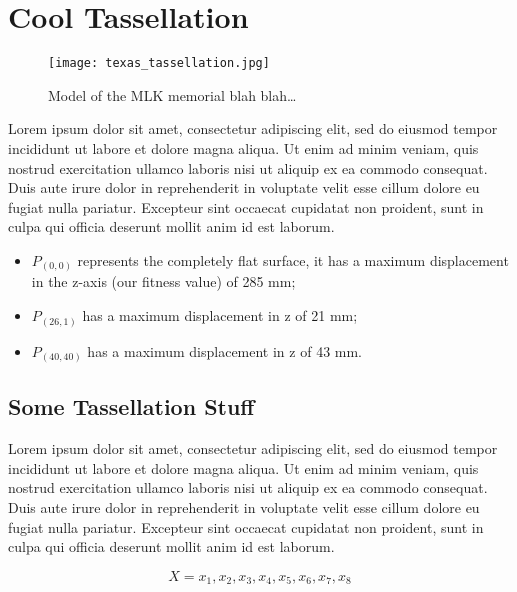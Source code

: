 \chapter{Cool Tassellation}
\label{chap:tass}


\begin{figure}[ht]%
\begin{center}
\begin{center}\texttt{[image: texas\_tassellation.jpg]}\end{center}
\caption{Model of the MLK memorial blah blah\ldots}
\label{fig:texas_tassellation}
\end{center}
\end{figure}

Lorem ipsum dolor sit amet, consectetur adipiscing elit, sed do eiusmod tempor
incididunt ut labore et dolore magna aliqua. Ut enim ad minim veniam, quis nostrud exercitation ullamco laboris nisi ut aliquip ex ea commodo consequat. Duis aute irure dolor in reprehenderit in voluptate velit esse cillum dolore eu fugiat nulla pariatur. Excepteur sint occaecat cupidatat non proident, sunt in culpa qui officia deserunt mollit anim id est laborum.

\begin{itemize}
\item $P_{(0,0)}$ represents the completely flat surface, it has a maximum displacement in the z-axis (our fitness value) of 285 mm;
\item $P_{(26,1)}$ has a maximum displacement in z of 21 mm; 
\item $P_{(40, 40)}$ has a maximum displacement in z of 43 mm.
\end{itemize}

\section{Some Tassellation Stuff}
\label{sec:tass_stuff}

 Lorem ipsum dolor sit amet, consectetur adipiscing elit, sed do eiusmod tempor
 incididunt ut labore et dolore magna aliqua. Ut enim ad minim veniam, quis nostrud exercitation ullamco laboris nisi ut aliquip ex ea commodo consequat. Duis aute irure dolor in reprehenderit in voluptate velit esse cillum dolore eu fugiat nulla pariatur. Excepteur sint occaecat cupidatat non proident, sunt in culpa qui officia deserunt mollit anim id est laborum.


\begin{equation}
X = x_{1},x_{2},x_{3},x_{4},x_{5},x_{6},x_{7},x_{8}
\end{equation} 

